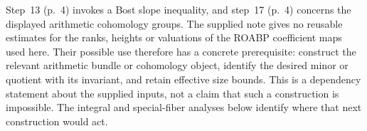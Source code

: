 Step~13 (p.~4) invokes a Bost slope inequality, and step~17 (p.~4) concerns the displayed arithmetic cohomology groups. The supplied note gives no reusable estimates for the ranks, heights or valuations of the ROABP coefficient maps used here. Their possible use therefore has a concrete prerequisite: construct the relevant arithmetic bundle or cohomology object, identify the desired minor or quotient with its invariant, and retain effective size bounds. This is a dependency statement about the supplied inputs, not a claim that such a construction is impossible. The integral and special-fiber analyses below identify where that next construction would act.
